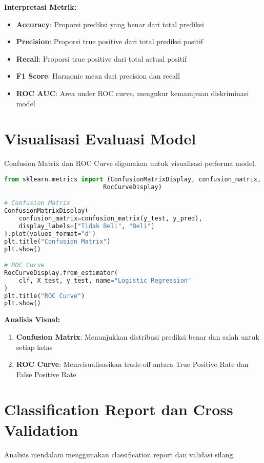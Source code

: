 \documentclass[11pt,a4paper]{article}
\begin{document}
    \noindent\textbf{Interpretasi Metrik:}
    \begin{itemize}
        \item \textbf{Accuracy}: Proporsi prediksi yang benar dari total prediksi
        \item \textbf{Precision}: Proporsi true positive dari total prediksi positif
        \item \textbf{Recall}: Proporsi true positive dari total actual positif
        \item \textbf{F1 Score}: Harmonic mean dari precision dan recall
        \item \textbf{ROC AUC}: Area under ROC curve, mengukur kemampuan diskriminasi model
    \end{itemize}


    \section{Visualisasi Evaluasi Model}
    Confusion Matrix dan ROC Curve digunakan untuk visualisasi performa model.

    \begin{codebox}
        \begin{lstlisting}[language=Python]
from sklearn.metrics import (ConfusionMatrixDisplay, confusion_matrix,
                           RocCurveDisplay)

# Confusion Matrix
ConfusionMatrixDisplay(
    confusion_matrix=confusion_matrix(y_test, y_pred),
    display_labels=["Tidak Beli", "Beli"]
).plot(values_format="d")
plt.title("Confusion Matrix")
plt.show()

# ROC Curve
RocCurveDisplay.from_estimator(
    clf, X_test, y_test, name="Logistic Regression"
)
plt.title("ROC Curve")
plt.show()
        \end{lstlisting}
    \end{codebox}

    \noindent\textbf{Analisis Visual:}
    \begin{enumerate}
        \item \textbf{Confusion Matrix}: Menunjukkan distribusi prediksi benar dan salah untuk setiap kelas
        \item \textbf{ROC Curve}: Memvisualisasikan trade-off antara True Positive Rate dan False Positive Rate
    \end{enumerate}


    \section{Classification Report dan Cross Validation}
    Analisis mendalam menggunakan classification report dan validasi silang.
\end{document}
